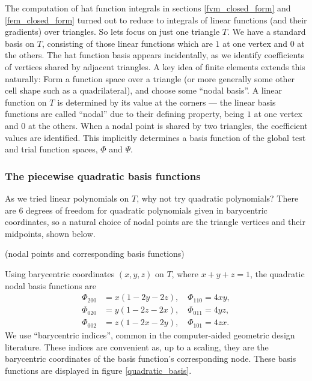 The computation of hat function integrals in sections \ref{fvm_closed_form} and \ref{fem_closed_form} turned out to reduce to
integrals of linear functions (and their gradients) over triangles. So lets focus on just one triangle $T$. We have a standard basis
on $T$, consisting of those linear functions which are $1$ at one vertex and $0$ at the others. The hat function basis appears incidentally,
as we identify coefficients of vertices shared by adjacent triangles.
A key idea of finite elements extends this naturally:
Form a function space over a triangle (or more generally some other cell shape such as a quadrilateral), and choose some ``nodal basis''.
A linear function on $T$ is determined by its value at the corners --- the linear basis functions are called ``nodal'' due to their defining property,
being $1$ at one vertex and $0$ at the others. When a nodal point is shared by two triangles, the coefficient values are identified. This implicitly
determines a basis function of the global test and trial function spaces, $\Phi$ and $\Psi$.

\subsubsection{The piecewise quadratic basis functions}
As we tried linear polynomials on $T$, why not try quadratic polynomials? There are $6$ degrees of freedom for quadratic polynomials
given in barycentric coordinates, so a natural choice of nodal points are the triangle vertices and their midpoints, shown below.

\vskip 0.2in
(nodal points and corresponding basis functions)
\vskip 0.2in

Using barycentric coordinates $(x,y,z)$ on $T$, where $x + y + z = 1$, the quadratic nodal basis functions are
\begin{equation}\label{quadratic_nodal}
\begin{split}
    \Phi_{200} &= x(1 - 2y - 2z),\quad 
    \Phi_{110} = 4xy,\\
    \Phi_{020} &= y(1 - 2z - 2x),\quad
    \Phi_{011} = 4yz,\\
    \Phi_{002} &= z(1 - 2x - 2y),\quad
    \Phi_{101} = 4zx.
\end{split}
\end{equation}
We use ``barycentric indices'', common in the computer-aided geometric design literature.
These indices are convenient as, up to a scaling, they are the barycentric coordinates of the basis function's corresponding node.
These basis functions are displayed in figure \ref{quadratic_basis}.

